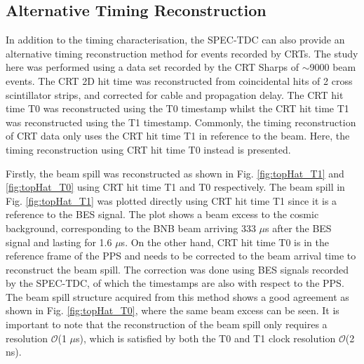 \subsection{Alternative Timing Reconstruction}
\label{sec:crt_time_alternative}

In addition to the timing characterisation, the SPEC-TDC can also provide an alternative timing reconstruction method for events recorded by CRTs.
The study here was performed using a data set recorded by the CRT Sharps of $\sim$9000 beam events. 
The CRT 2D hit time was reconstructed from coincidental hits of 2 cross scintillator strips, and corrected for cable and propagation delay.
The CRT hit time T0 was reconstructed using the T0 timestamp whilst the CRT hit time T1 was reconstructed using the T1 timestamp. 
Commonly, the timing reconstruction of CRT data only uses the CRT hit time T1 in reference to the beam.
Here, the timing reconstruction using CRT hit time T0 instead is presented.

Firstly, the beam spill was reconstructed as shown in Fig. \ref{fig:topHat_T1} and \ref{fig:topHat_T0} using CRT hit time T1 and T0 respectively.
The beam spill in Fig. \ref{fig:topHat_T1} was plotted directly using CRT hit time T1 since it is a reference to the BES signal.
The plot shows a beam excess to the cosmic background, corresponding to the BNB beam arriving 333 $\mu$s after the BES signal and lasting for 1.6 $\mu$s.
On the other hand, CRT hit time T0 is in the reference frame of the PPS and needs to be corrected to the beam arrival time to reconstruct the beam spill.
The correction was done using BES signals recorded by the SPEC-TDC, of which the timestamps are also with respect to the PPS. %
The beam spill structure acquired from this method shows a good agreement as shown in Fig. \ref{fig:topHat_T0}, where the same beam excess can be seen.
It is important to note that the reconstruction of the beam spill only requires a resolution $\mathcal{O}$(1 $\mu$s), which is satisfied by both the T0 and T1 clock resolution $\mathcal{O}$(2 ns).

